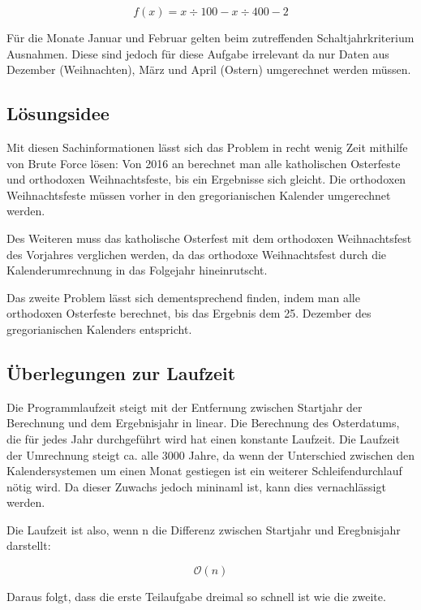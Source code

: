 	\[f(x)=x\div{}100-x\div{}400-2\]

	Für die Monate Januar und Februar gelten beim zutreffenden Schaltjahrkriterium Ausnahmen. Diese sind jedoch für diese Aufgabe irrelevant da nur Daten aus Dezember (Weihnachten), März und April (Ostern) umgerechnet werden müssen.

\clearpage
\subsection {Lösungsidee}
	Mit diesen Sachinformationen lässt sich das Problem in recht wenig Zeit mithilfe von Brute Force lösen: Von 2016 an berechnet man alle katholischen Osterfeste und orthodoxen Weihnachtsfeste, bis ein Ergebnisse sich gleicht. Die orthodoxen Weihnachtsfeste müssen vorher in den gregorianischen Kalender umgerechnet werden. 

	Des Weiteren muss das katholische Osterfest mit dem orthodoxen Weihnachtsfest des Vorjahres verglichen werden, da das orthodoxe Weihnachtsfest  durch die Kalenderumrechnung in das Folgejahr hineinrutscht.

	Das zweite Problem lässt sich dementsprechend finden, indem man alle orthodoxen Osterfeste berechnet, bis das Ergebnis dem 25. Dezember des gregorianischen Kalenders entspricht.

\subsection {Überlegungen zur Laufzeit}
Die Programmlaufzeit steigt mit der Entfernung zwischen Startjahr der Berechnung und dem Ergebnisjahr in linear. Die Berechnung des Osterdatums, die für jedes Jahr durchgeführt wird hat einen konstante Laufzeit. Die Laufzeit der Umrechnung steigt ca. alle 3000 Jahre, da wenn der Unterschied zwischen den Kalendersystemen um einen Monat gestiegen ist ein weiterer Schleifendurchlauf nötig wird. Da dieser Zuwachs jedoch mininaml ist, kann dies vernachlässigt werden.

Die Laufzeit ist also, wenn n die Differenz zwischen Startjahr und Eregbnisjahr darstellt:

\[\mathcal O(n)\]

Daraus folgt, dass die erste Teilaufgabe dreimal so schnell ist wie die zweite.